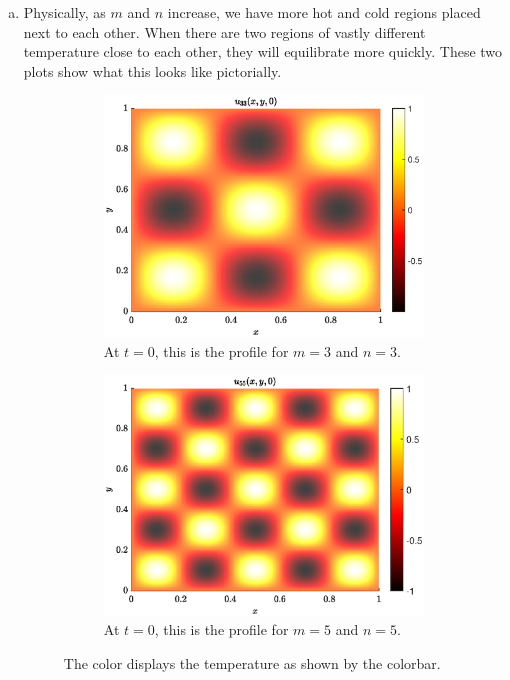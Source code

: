 \documentclass[12pt]{article} %
\begin{document}
\begin{solution}
\begin{enumerate}[(a)]
    \item Physically, as $m$ and $n$ increase, we have more hot and cold regions placed next to each other.  When there are two regions of vastly different temperature close to each other, they will equilibrate more quickly.  These two plots show what this looks like pictorially.
    \begin{figure}[H]
            \begin{subfigure}[b]{0.45\textwidth}
            	\centering
            	\includegraphics[width=\textwidth]{figures/heat_solution_m=3_n=3}
                \caption{At $t=0$, this is the profile for $m=3$ and $n=3$.}
            \end{subfigure}
\hfill
            \begin{subfigure}[b]{0.45\textwidth}
            	\centering
                \includegraphics[width=\textwidth]{figures/heat_solution_m=5_n=5}
                \caption{At $t=0$, this is the profile for $m=5$ and $n=5$.}
            \end{subfigure}
\caption{The color displays the temperature as shown by the colorbar.}
        \end{figure}
\end{enumerate}
\end{solution}
\end{document}
